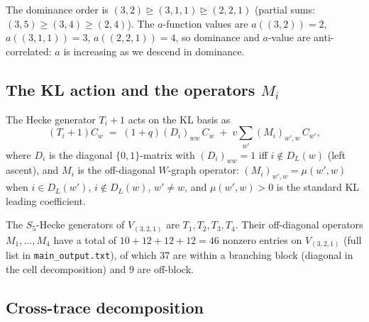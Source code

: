 \documentclass[11pt]{article}
\theoremstyle{definition}
\begin{document}
The dominance order is $(3,2) \trianglerighteq (3,1,1) \trianglerighteq (2,2,1)$ (partial sums: $(3,5) \geq (3,4) \geq (2,4)$). The $a$-function values are $a((3,2)) = 2$, $a((3,1,1)) = 3$, $a((2,2,1)) = 4$, so dominance and $a$-value are anti-correlated: $a$ is increasing as we descend in dominance.

\subsection*{The KL action and the operators $M_i$}

The Hecke generator $T_i + 1$ acts on the KL basis as
\begin{equation}\label{eq:Ti+1}
(T_i + 1) C_w \;=\; (1+q) (D_i)_{ww}\, C_w \;+\; v \sum_{w'} (M_i)_{w', w}\, C_{w'},
\end{equation}
where $D_i$ is the diagonal $\{0,1\}$-matrix with $(D_i)_{ww} = 1$ iff $i \notin D_L(w)$ (left ascent), and $M_i$ is the off-diagonal $W$-graph operator: $(M_i)_{w', w} = \mu(w', w)$ when $i \in D_L(w')$, $i \notin D_L(w)$, $w' \neq w$, and $\mu(w', w) > 0$ is the standard KL leading coefficient.

The $S_5$-Hecke generators of $V_{(3,2,1)}$ are $T_1, T_2, T_3, T_4$. Their off-diagonal operators $M_1, \ldots, M_4$ have a total of $10 + 12 + 12 + 12 = 46$ nonzero entries on $V_{(3,2,1)}$ (full list in \texttt{main\_output.txt}), of which $37$ are within a branching block (diagonal in the cell decomposition) and $9$ are off-block.

\subsection*{Cross-trace decomposition}
\end{document}
